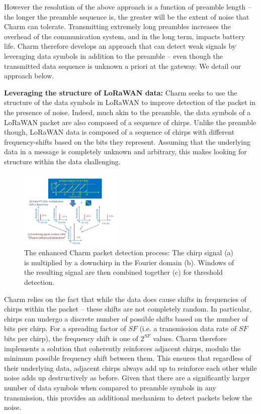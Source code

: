 However the resolution of the above approach is a function of preamble length
-- the longer the preamble sequence is, the greater will be the extent of
noise that Charm can tolerate. Transmitting extremely long preambles increases
the overhead of the communication system, and in the long term, impacts
battery life. Charm therefore develops an approach that can detect weak
signals by leveraging data symbols in addition to the preamble -- even though
the transmitted data sequence is unknown a priori at the gateway. We detail
our approach below.

\noindent \textbf{Leveraging the structure of LoRaWAN data: } Charm seeks to
use the structure of the data symbols in LoRaWAN to improve detection of the
packet in the presence of noise. Indeed, much akin to the preamble, the data
symbols of a LoRaWAN packet are also composed of a sequence of chirps. Unlike
the preamble though, LoRaWAN data is composed of a sequence of chirps with
different frequency-shifts based on the bits they represent. Assuming that the
underlying data in a message is completely unknown and arbitrary, this makes
looking for structure within the data challenging.


\begin{figure}
    \centering
    \includegraphics[width=0.45\textwidth]{figures/CharmEnhancedDetection.pdf}
        \vspace*{-0.1in}
    \caption{The enhanced Charm packet detection process: The chirp signal (a)
    is multiplied by a downchirp in the Fourier domain (b). Windows of the
    resulting signal are then combined together (c) for threshold detection.}
    \label{fig:enhanced_charm}
    \compactimg
\end{figure}

Charm relies on the fact that while the data does cause shifts in frequencies
of chirps within the packet -- these shifts are not completely random. In
particular, chirps can undergo a discrete number of possible shifts based on
the number of bits per chirp. For a spreading factor of $SF$ (i.e. a
transmission data rate of $SF$ bits per chirp), the frequency shift is one of
$2^{SF}$ values. Charm therefore implements a solution that coherently
reinforces adjacent chirps, modulo the minimum possible frequency shift
between them. This ensures that regardless of their underlying data, adjacent
chirps always add up to reinforce each other while noise adds up destructively
as before. Given that there are a significantly larger number of data symbols
when compared to preamble symbols in any transmission, this provides an
additional mechanism to detect packets below the noise.

